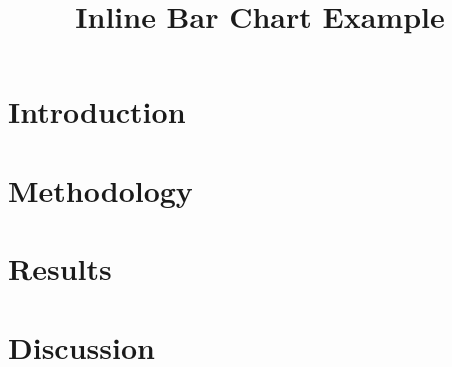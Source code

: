 \documentclass[sigconf]{acmart}
\begin{document}
\title{Inline Bar Chart Example}
\begin{abstract}
    \lipsum[1]
\end{abstract}

\maketitle

\section{Introduction}
\lipsum[1]

\section{Methodology}
\lipsum[2-4]

\section{Results}
\lipsum[5-7]



\section{Discussion}
\cite{TeXFAQ}
\lipsum



\end{document}
